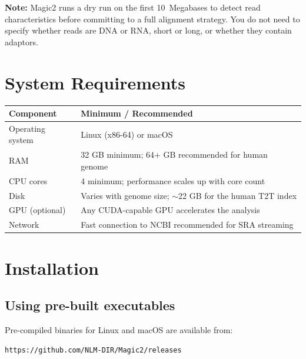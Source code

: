 \documentclass[11pt]{article}
\begin{document}
\begin{notebox}
\textbf{Note:} Magic2 runs a dry run on the first 10~Megabases to detect
read characteristics before committing to a full alignment strategy.
You do not need to specify whether reads are DNA or RNA, short or long,
or whether they contain adaptors.
\end{notebox}

\section{System Requirements}

\begin{center}
\begin{tabular}{ll}
\toprule
\textbf{Component} & \textbf{Minimum / Recommended} \\
\midrule
Operating system & Linux (x86-64) or macOS \\
RAM              & 32 GB minimum; 64+ GB recommended for human genome \\
CPU cores        & 4 minimum; performance scales up with core count \\
Disk             & Varies with genome size; \(\sim\)22 GB for the human T2T index \\
GPU (optional)   & Any CUDA-capable GPU accelerates the analysis \\
Network          & Fast connection to NCBI recommended for SRA streaming \\
\bottomrule
\end{tabular}
\end{center}

\section{Installation}

\subsection{Using pre-built executables}

Pre-compiled binaries for Linux and macOS are available from:
\begin{lstlisting}
https://github.com/NLM-DIR/Magic2/releases
\end{lstlisting}
\end{document}
